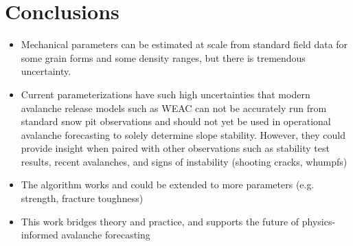 \documentclass[journal abbreviation, manuscript]{copernicus}
\begin{document}
\section{Conclusions}  %
\begin{itemize}
    \item     Mechanical parameters can be estimated at scale from standard field data for some grain forms and some density ranges, but there is tremendous uncertainty.
    \item Current parameterizations have such high uncertainties that modern avalanche release models such as WEAC can not be accurately run from standard snow pit observations and should not yet be used in operational avalanche forecasting to solely determine slope stability. However, they could provide insight when paired with other observations such as stability test results, recent avalanches, and signs of instability (shooting cracks, whumpfs)
    \item The algorithm works and could be extended to more parameters (e.g. strength, fracture toughness)
    \item This work bridges theory and practice, and supports the future of physics-informed avalanche forecasting
\end{itemize}












\appendix
\section{}    %
\end{document}

